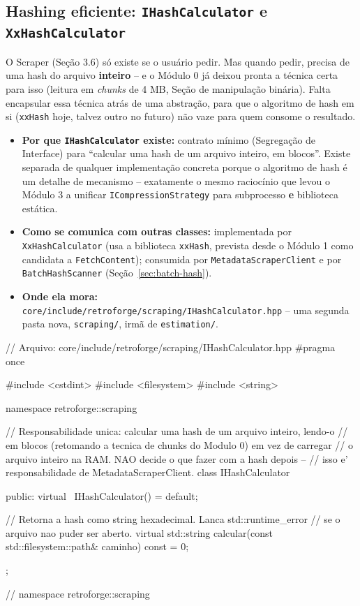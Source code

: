\subsection{Hashing eficiente: \texttt{IHashCalculator} e \texttt{XxHashCalculator}}

O Scraper (Seção 3.6) só existe se o usuário pedir. Mas quando pedir, precisa de uma hash do arquivo \textbf{inteiro} -- e o Módulo 0 já deixou pronta a técnica certa para isso (leitura em \textit{chunks} de 4 MB, Seção de manipulação binária). Falta encapsular essa técnica atrás de uma abstração, para que o algoritmo de hash em si (\texttt{xxHash} hoje, talvez outro no futuro) não vaze para quem consome o resultado.

\begin{itemize}
    \item \textbf{Por que \texttt{IHashCalculator} existe:} contrato mínimo (Segregação de Interface) para ``calcular uma hash de um arquivo inteiro, em blocos''. Existe separada de qualquer implementação concreta porque o algoritmo de hash é um detalhe de mecanismo -- exatamente o mesmo raciocínio que levou o Módulo 3 a unificar \texttt{ICompressionStrategy} para subprocesso \textbf{e} biblioteca estática.
    \item \textbf{Como se comunica com outras classes:} implementada por \texttt{XxHashCalculator} (usa a biblioteca \texttt{xxHash}, prevista desde o Módulo 1 como candidata a \texttt{FetchContent}); consumida por \texttt{MetadataScraperClient} e por \texttt{BatchHashScanner} (Seção~\ref{sec:batch-hash}).
    \item \textbf{Onde ela mora:} \texttt{core/include/retroforge/scraping/IHashCalculator.hpp} -- uma segunda pasta nova, \texttt{scraping/}, irmã de \texttt{estimation/}.
\end{itemize}

\begin{CaixaCodigo}
// Arquivo: core/include/retroforge/scraping/IHashCalculator.hpp
#pragma once

#include <cstdint>
#include <filesystem>
#include <string>

namespace retroforge::scraping {

// Responsabilidade unica: calcular uma hash de um arquivo inteiro, lendo-o
// em blocos (retomando a tecnica de chunks do Modulo 0) em vez de carregar
// o arquivo inteiro na RAM. NAO decide o que fazer com a hash depois --
// isso e' responsabilidade de MetadataScraperClient.
class IHashCalculator {
public:
    virtual ~IHashCalculator() = default;

    // Retorna a hash como string hexadecimal. Lanca std::runtime_error
    // se o arquivo nao puder ser aberto.
    virtual std::string calcular(const std::filesystem::path& caminho) const = 0;
};

} // namespace retroforge::scraping
\end{CaixaCodigo}

